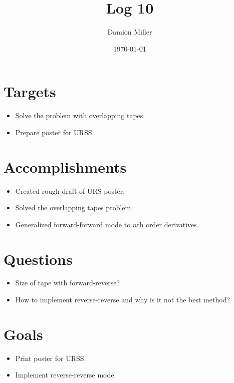 \documentclass[12pt, letterpaper]{article}
\title{Log 10}
\author{Damion Miller}
\date{\today}
\begin{document}
\maketitle
\section*{Targets}
\begin{itemize}
\item Solve the problem with overlapping tapes.
\item Prepare poster for URSS.
\end{itemize}

\section*{Accomplishments}
\begin{itemize}
\item Created rough draft of URS poster.
\item Solved the overlapping tapes problem.
\item Generalized forward-forward mode to $n$th order derivatives.
\end{itemize}

\section*{Questions}
\begin{itemize}
\item Size of tape with forward-reverse?
\item How to implement reverse-reverse and why is it not the best method?
\end{itemize}

\section*{Goals}
\begin{itemize}
\item Print poster for URSS.
\item Implement reverse-reverse mode.
\end{itemize}
\end{document}
